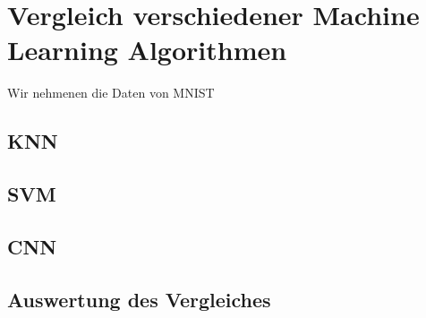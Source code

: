 \section{Vergleich verschiedener Machine Learning Algorithmen}
Wir nehmenen die Daten von MNIST
\subsection{KNN}

\subsection{SVM}

\subsection{CNN}

\subsection{Auswertung des Vergleiches}
